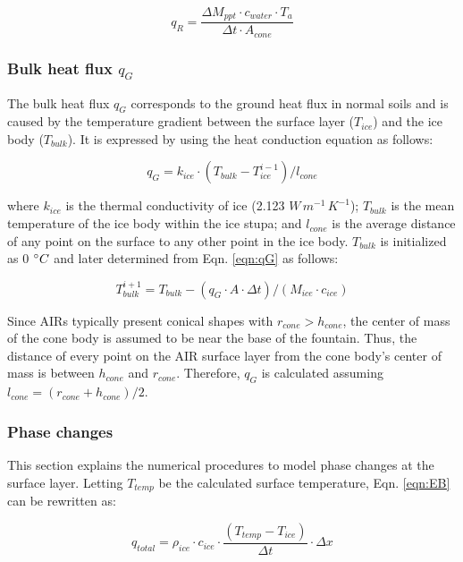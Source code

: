 \begin{equation}
	q_{R} = \frac{ \Delta M_{ppt} \cdot c_{water} \cdot T_a}{\Delta t \cdot A_{cone}}
	\label{eqn:qR}
\end{equation}

\subsubsection{Bulk heat flux \texorpdfstring{$q_{G}$}{Lg}} \label{sec:Bulkflux}

The bulk heat flux $q_{G}$ corresponds to the ground heat flux in normal soils and is caused by the
temperature gradient between the surface layer ($T_{ice}$) and the ice body ($T_{bulk}$). It is expressed by
using the heat conduction equation as follows:

\begin{equation} q_{G} = k_{ice} \cdot (T_{bulk}-T_{ice}^{i-1})/l_{cone} \label{eqn:qG}    \end{equation}

where $k_{ice}$ is the thermal conductivity of ice (2.123 $W\, m^{-1}\,K^{-1}$); $T_{bulk}$ is the mean
temperature of the ice body within the ice stupa; and $l_{cone}$ is the average distance of any point on the
surface to any other point in the ice body. $T_{bulk}$ is initialized as 0 $^{\circ} C$ and later determined from
Eqn. \ref{eqn:qG} as follows:

\begin{equation} T_{bulk}^{i+1} = T_{bulk} - (q_{G} \cdot A \cdot \Delta t)/(M_{ice} \cdot c_{ice}) \end{equation}

Since \ac{AIRs} typically present conical shapes with $r_{cone} > h_{cone}$, the center of mass of the cone body is
assumed to be near the base of the fountain. Thus, the distance of every point on the \ac{AIR} surface layer from the
cone body's center of mass is between $h_{cone}$ and $r_{cone}$. Therefore, $q_{G}$ is calculated assuming
$l_{cone} = (r_{cone} + h_{cone})/2$.

\subsubsection{Phase changes}\label{sec:phase}

This section explains the numerical procedures to model phase changes at the surface layer. Letting
$T_{temp}$ be the calculated surface temperature, Eqn. \ref{eqn:EB} can be rewritten as:

$$q_{total} =\rho_{ice} \cdot c_{ice} \cdot \frac{(T_{temp}-T_{ice})}{\Delta t} \cdot \Delta x$$

